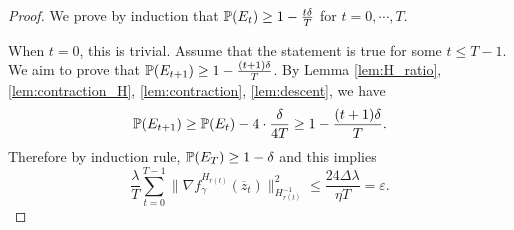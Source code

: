 \documentclass{article} %
\numberwithin{equation}{section}
\begin{document}
\begin{proof}
    We prove by induction that $\mathbb{P}(E_t)\geq 1-\frac{t\delta}{T}$ for $t=0, \cdots, T$.
    
    When $t=0$, this is trivial. Assume that the statement is true for some $t\leq T-1$. We aim to prove that $\mathbb{P}(E_{t+1})\geq 1-\frac{(t+1)\delta}{T}$. 
    By Lemma \ref{lem:H_ratio}, \ref{lem:contraction_H}, \ref{lem:contraction}, \ref{lem:descent}, we have
    \begin{equation}
        \mathbb{P}(E_{t+1}) \geq \mathbb{P}(E_t) - 4\cdot \frac{\delta}{4T} \geq 1-\frac{(t+1)\delta}{T}.
    \end{equation}
    Therefore by induction rule, $\mathbb{P}(E_T)\geq 1-\delta$ and this implies
    \begin{equation}
        \frac{\lambda}{T}\sum_{t=0}^{T-1}\|\nabla f_\gamma^{H_{r(t)}}(\overline{z}_t)\|_{H_{r(t)}^{-1}}^2 \leq \frac{24\Delta\lambda}{\eta T} = \varepsilon.
    \end{equation}
    

\end{proof}
\end{document}
